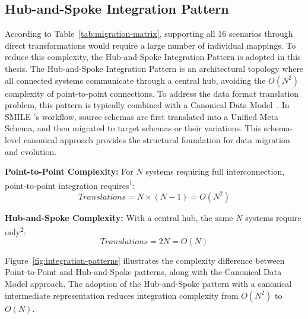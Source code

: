 \subsection{Hub-and-Spoke Integration Pattern}
\label{sec:stateoftheart:fundamentals:hubandspoke}

According to Table~\ref{tab:migration-matrix}, supporting all 16 scenarios
through direct transformations would require a large number of individual
mappings. To reduce this complexity, the Hub-and-Spoke Integration Pattern
is adopted in this thesis.
The Hub-and-Spoke Integration Pattern is an architectural topology
where all connected systems communicate through a central hub, avoiding the $O(N^2)$ complexity of point-to-point connections. To address the data format translation problem, this pattern is typically combined with a Canonical Data Model~\cite{hohpe2004enterprise}. In SMILE 's workflow, source schemas are first translated into a Unified
Meta Schema, and then migrated to target schemas or their variations. This schema-level canonical approach provides the structural foundation for data migration and evolution.

\textbf{Point-to-Point Complexity:} For $N$ systems requiring full interconnection, point-to-point integration requires\textsuperscript{1}:
$$Translations = N \times (N - 1) = O(N^2)$$

\textbf{Hub-and-Spoke Complexity:} With a central hub, the same $N$ systems require only\textsuperscript{2}:
$$Translations = 2N = O(N)$$


Figure~\ref{fig:integration-patterns} illustrates the complexity difference between Point-to-Point and Hub-and-Spoke patterns, along with the Canonical Data Model approach.
The adoption of the Hub-and-Spoke pattern with a canonical intermediate representation reduces integration complexity from $O(N^2)$ to $O(N)$.

